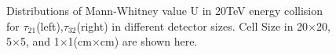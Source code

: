 \begin{figure}
\begin{center}
{   }

\end{center}
\caption{Distributions of Mann-Whitney value U in 20TeV energy collision for $\tau_{21}$(left),$\tau_{32}$(right) in different detector sizes. Cell Size in 20$\times$20, 5$\times$5, and 1$\times$1(cm$\times$cm) are shown here.}
\label{fig:cluster_tau21_tau32}
\end{figure}


